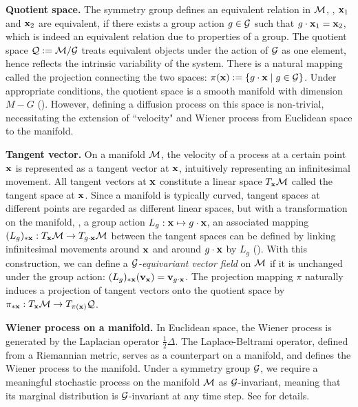 \documentclass{article} %
\begin{document}
\textbf{Quotient space.}
The symmetry group defines an equivalent relation in $\mathcal{M}$, \ie, $\mathbf{x}_1$ and $\mathbf{x}_2$ are equivalent, if there exists a group action $g \in \mathcal{G}$ such that $g \cdot \mathbf{x}_1 = \mathbf{x}_2$, which is indeed an equivalent relation due to properties of a group.
The quotient space $\mathcal{Q} := \mathcal{M} / \mathcal{G}$ treats equivalent objects under the action of $\mathcal{G}$ as one element, hence reflects the intrinsic variability of the system.
There is a natural mapping called the projection connecting the two spaces: $\pi(\mathbf{x}) := \{ g \cdot \mathbf{x} \mid g \in \mathcal{G} \}$.
Under appropriate conditions, the quotient space is a smooth manifold with dimension $M - G$ (). However, defining a diffusion process on this space is non-trivial, necessitating the extension of ``velocity" and Wiener process from Euclidean space to the manifold.

\textbf{Tangent vector.}  On a manifold $\mathcal{M}$, the velocity of a process at a certain point $\mathbf{x}$ is represented as a tangent vector at $\mathbf{x}$, intuitively representing an infinitesimal movement. 
All tangent vectors at $\mathbf{x}$ constitute a linear space $T_{\mathbf{x}}\mathcal{M}$ called the tangent space at $\mathbf{x}$.
Since a manifold is typically curved, tangent spaces at different points are regarded as different linear spaces, but with a transformation on the manifold, \eg, a group action $L_g:\mathbf{x}\mapsto g\cdot\mathbf{x}$, an associated mapping $(L_g)_{*\mathbf{x}}:T_{\mathbf{x}} \mathcal{M} \to T_{g \cdot \mathbf{x}} \mathcal{M}$ between the tangent spaces can be defined by linking infinitesimal movements around $\mathbf{x}$ and around $g \cdot \mathbf{x}$ by $L_g$ (). 
With this construction, we can define a \emph{$\mathcal{G}$-equivariant vector field} on $\mathcal{M}$ if it is unchanged under the group action: $(L_g)_{*\mathbf{x}}(\mathbf{v}_{\mathbf{x}}) = \mathbf{v}_{g \cdot \mathbf{x}}$. 
The projection mapping $\pi$ naturally induces a projection of tangent vectors onto the quotient space by $\pi_{*\mathbf{x}}: T_{\mathbf{x}} \mathcal{M} \to T_{\pi(\mathbf{x})} \mathcal{Q}$.

\textbf{Wiener process on a manifold.} In Euclidean space, the Wiener process is generated by the Laplacian operator $\frac{1}{2}\Delta$. 
The Laplace-Beltrami operator, defined from a Riemannian metric, serves as a counterpart on a manifold, and defines the Wiener process to the manifold.
Under a symmetry group $\mathcal{G}$, we require a meaningful stochastic process on the manifold $\mathcal{M}$ as $\mathcal{G}$-invariant, meaning that its marginal distribution is $\mathcal{G}$-invariant at any time step. See  for details. 
\vspace{-3pt}
\end{document}
